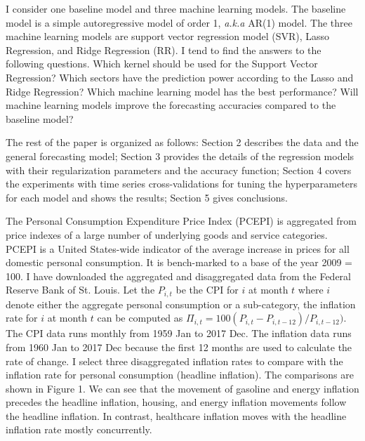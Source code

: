 \documentclass[10pt,twocolumn,letterpaper]{article}
\begin{document}
I consider one baseline model and three machine learning models. The baseline model is a simple autoregressive model of order 1, \textit{a.k.a} AR(1) model. The three machine learning models are support vector regression model (SVR), Lasso Regression, and Ridge Regression (RR). I tend to find the answers to the following questions. Which kernel should be used for the Support Vector Regression?  Which sectors have the prediction power according to the Lasso and Ridge Regression? Which machine learning model has the best performance? Will machine learning models improve the forecasting accuracies compared to the baseline model?

The rest of the paper is organized as follows: Section 2 describes the data and the general forecasting model; Section 3 provides the details of the regression models with their regularization parameters and the accuracy function; Section 4 covers the experiments with time series cross-validations for tuning the hyperparameters for each model and shows the results; Section 5 gives conclusions. 



The Personal Consumption Expenditure Price Index (PCEPI) is aggregated from price indexes of a large number of underlying goods and service categories. PCEPI is a United States-wide indicator of the average increase in prices for all domestic personal consumption. It is bench-marked to a base of the year 2009 = 100. I have downloaded the aggregated and disaggregated data from the Federal Reserve Bank of St. Louis. Let the $P_{i, t}$ be the CPI for $i$ at month $t$ where $i$ denote either the aggregate personal consumption or a sub-category, the inflation rate for $i$ at month $t$ can be computed as $\Pi_{i, t} = 100(P_{i, t} - P_{i, t-12})/P_{i, t-12})$. The CPI data runs monthly from 1959 Jan to 2017 Dec. The inflation data runs from 1960 Jan to 2017 Dec because the first 12 months are used to calculate the rate of change. I select three disaggregated inflation rates to compare with the inflation rate for personal consumption (headline inflation). The comparisons are shown in Figure 1. We can see that the movement of gasoline and energy inflation precedes the headline inflation, housing, and energy inflation movements follow the headline inflation. In contrast, healthcare inflation moves with the headline inflation rate mostly concurrently. 
\end{document}
